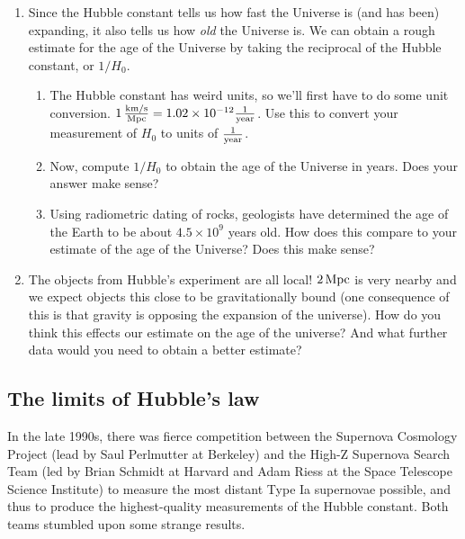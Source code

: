 \documentclass[11pt]{article}
\begin{document}
\begin{enumerate}
\begin{enumerate}
            \item What value do you get for $R^2$? $R^2$ is a measure of how good the line fits the data, with $R^2 = 1$ being a perfect fit. Would you characterize this linear model as a ``good'' fit?
        \end{enumerate}
        
    \item Since the Hubble constant tells us how fast the Universe is (and has been) expanding, it also tells us how \emph{old} the Universe is. We can obtain a rough estimate for the age of the Universe by taking the reciprocal of the Hubble constant, or $1/H_0$.
    \begin{enumerate}
        \item The Hubble constant has weird units, so we'll first have to do some unit conversion. $1 \rm \, \frac{km/s}{Mpc} = 1.02 \times 10^{-12} \frac{1}{year}$. Use this to convert your measurement of $H_0$ to units of $\frac{1}{\rm year}$.
        
        \item Now, compute $1/H_0$ to obtain the age of the Universe in years. Does your answer make sense?
        
        \item Using radiometric dating of rocks, geologists have determined the age of the Earth to be about $4.5 \times 10^9$ years old. How does this compare to your estimate of the age of the Universe? Does this make sense?
    \end{enumerate}

    \item The objects from Hubble's experiment are all local! $2\,\rm{Mpc}$ is very nearby and we expect objects this close to be gravitationally bound (one consequence of this is that gravity is opposing the expansion of the universe). How do you think this effects our estimate on the age of the universe? And what further data would you need to obtain a better estimate?
\end{enumerate}




\subsection{The limits of Hubble's law}

In the late 1990s, there was fierce competition between the Supernova Cosmology Project (lead by Saul Perlmutter at Berkeley) and the High-Z Supernova Search Team (led by Brian Schmidt at Harvard and Adam Riess at the Space Telescope Science Institute) to measure the most distant Type Ia supernovae possible, and thus to produce the highest-quality measurements of the Hubble constant. Both teams stumbled upon some strange results.
\end{document}
